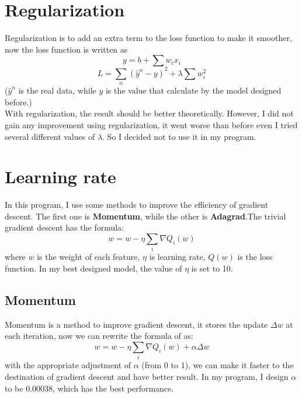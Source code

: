 \documentclass[11pt]{article}
\newcommand\n{\mbox{\qquad}}
\begin{document}
\section{Regularization}
\n Regularization is to add an extra term to the loss function to make it smoother, now the loss function is written as
\[ y = b + \sum w_i x_i \]
\begin{equation}
	L = \sum_n (\widehat{y}^n - y)^2 + \lambda \sum w_i^2
\end{equation}
\n ($\widehat{y}^n$ is the real data, while $y$ is the value that calculate by the model designed before.)\\
	With regularization, the result should be better theoretically. However, I did not gain any improvement using regularization, it went worse than before even  I tried several different values of $\lambda$. So I decided not to use it in my program. 

\section{Learning rate}
\n In this program, I use some methods to improve the efficiency of gradient descent. The first one is \textbf{Momentum}, while the other is \textbf{Adagrad}.The trivial gradient descent has the formula:
	\begin{equation}
		w = w - \eta \sum_i \nabla Q_i(w)
	\end{equation}
where $w$ is the weight of each feature, $\eta$ is learning rate, $Q(w)$ is the loss function. In my best designed model, the value of $\eta$ is set to 10.
\subsection{Momentum}
\n Momentum is a method to improve gradient descent, it stores the update $\Delta w$ at each iteration, now we can rewrite the formula of as:
	\begin{equation}
		w = w - \eta \sum_i \nabla Q_i(w) + \alpha \Delta w
	\end{equation}
with the appropriate adjustment of $\alpha$ (from 0 to 1), we can make it faster to the destination of gradient descent and have better result. In my program, I design $\alpha$ to be 0.00038, which has the best performance. 
\end{document}
